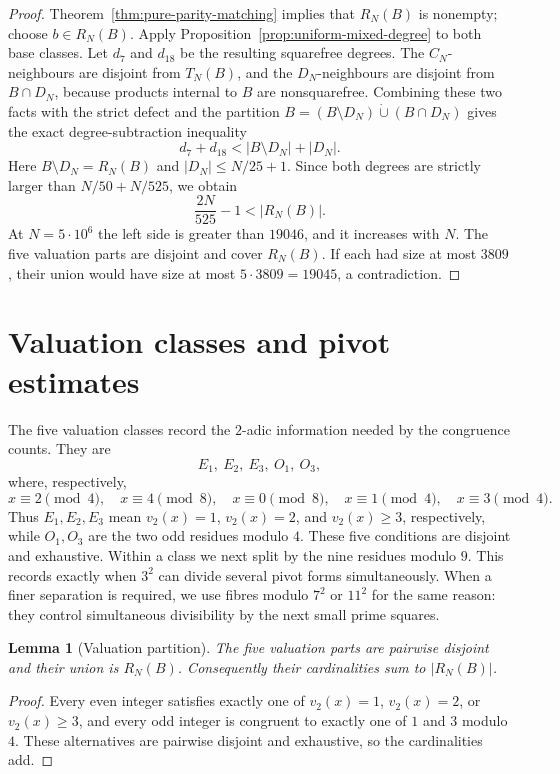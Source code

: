 \documentclass[11pt]{article}
\newtheorem{lemma}[theorem]{Lemma}
\theoremstyle{definition}
\newcommand{\CN}{C_N}
\newcommand{\DN}{D_N}
\newcommand{\TN}{T_N}
\newcommand{\RN}{R_N}
\newcommand{\FiveMillion}{5\cdot10^6}
\begin{document}
\begin{proof}
Theorem~\ref{thm:pure-parity-matching} implies that $\RN(B)$ is nonempty;
choose $b\in\RN(B)$.  Apply Proposition~\ref{prop:uniform-mixed-degree} to
both base classes.  Let $d_7$ and $d_{18}$ be the resulting squarefree
degrees.  The $\CN$-neighbours are disjoint from $\TN(B)$, and the
$\DN$-neighbours are disjoint from $B\cap\DN$, because products internal to
$B$ are nonsquarefree.  Combining these two facts with the strict defect and
the partition
$B=(B\setminus\DN)\mathbin{\dot\cup}(B\cap\DN)$ gives the exact
degree-subtraction inequality
\[
 d_7+d_{18}<|B\setminus\DN|+|\DN|.
\]
Here $B\setminus\DN=\RN(B)$ and $|\DN|\leq N/25+1$.  Since both degrees are
strictly larger than $N/50+N/525$, we obtain
\[
 \frac{2N}{525}-1<|\RN(B)|.
\]
At $N=\FiveMillion$ the left side is greater than $19046$, and it increases
with $N$.  The five valuation parts are disjoint and cover $\RN(B)$.  If
each had size at most $3809$, their union would have size at most
$5\cdot3809=19045$, a contradiction.
\end{proof}

\section{Valuation classes and pivot estimates}

 The five valuation classes record the $2$-adic information needed by
the congruence counts.  They are
\[
 E_1,\ E_2,\ E_3,\ O_1,\ O_3,
\]
where, respectively,
\[
 x\equiv2\pmod4,\quad x\equiv4\pmod8,\quad x\equiv0\pmod8,
 \quad x\equiv1\pmod4,\quad x\equiv3\pmod4.
\]
Thus $E_1,E_2,E_3$ mean $v_2(x)=1$, $v_2(x)=2$, and $v_2(x)\geq3$,
respectively, while $O_1,O_3$ are the two odd residues modulo $4$.  These five
 conditions are disjoint and exhaustive.
Within a class we next split by the nine residues modulo $9$.  This records
exactly when $3^2$ can divide several pivot forms simultaneously.  When a
finer separation is required, we use fibres modulo $7^2$ or $11^2$ for the
same reason: they control simultaneous divisibility by the next small prime
squares.

\begin{lemma}[Valuation partition]\label{lem:valuation-partition}
The five valuation parts are pairwise disjoint and their union is
$\RN(B)$.  Consequently their cardinalities sum to $|\RN(B)|$.
\end{lemma}

\begin{proof}
 Every even integer satisfies exactly one of $v_2(x)=1$, $v_2(x)=2$, or
 $v_2(x)\geq3$, and every odd integer is congruent to exactly one of $1$ and
 $3$ modulo $4$.  These alternatives are pairwise disjoint and exhaustive,
 so the cardinalities add.
\end{proof}
\end{document}
